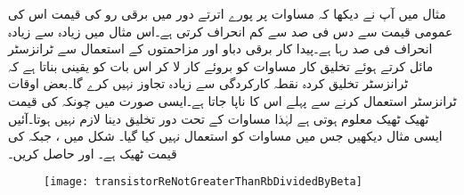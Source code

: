مثال  میں آپ نے دیکھا کہ مساوات   پر پورے اترتے دور میں برقی رو کی قیمت اس کی عمومی قیمت سے دس فی صد سے کم انحراف کرتی ہے۔اس مثال میں زیادہ سے زیادہ انحراف   فی صد رہا ہے۔پیدا کار برقی دباو اور مزاحمتوں کے استعمال سے ٹرانزسٹر مائل کرتے ہوئے تخلیق کار مساوات   کو بروئے کار لا کر اس بات کو یقینی بناتا ہے کہ ٹرانزسٹر تخلیق کردہ نقطہ کارکردگی سے زیادہ تجاوز نہیں کرے گا۔بعض اوقات ٹرانزسٹر استعمال کرنے سے پہلے اس کا  ناپا جاتا ہے۔ایسی صورت میں چونکہ  کی قیمت ٹھیک ٹھیک معلوم ہوتی ہے لہٰذا مساوات  کے تحت دور تخلیق دینا لازم نہیں ہوتا۔آئیں ایسی مثال دیکھیں جس میں مساوات  کو استعمال نہیں کیا گیا۔
شکل  میں  ،  جبکہ  کی قیمت ٹھیک  ہے۔ اور  حاصل کریں۔
\begin{figure}
\centering
\texttt{[image: transistorReNotGreaterThanRbDividedByBeta]}
\caption{}
\label{شکل_ٹرانزسٹر_بیٹا_ٹھیک_ٹھیک_معلوم}
\end{figure}

